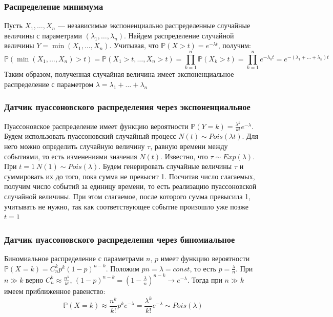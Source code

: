 \documentclass{article}
\theoremstyle{definition}
\begin{document}
\subsubsection{Распределение минимума}

Пусть $X_1, \dots, X_n$ --- независимые экспоненциально распределенные случайные величины с параметрами $(\lambda_1, \dots, \lambda_n)$. Найдем распределение случайной величины $Y = \min(X_1, \dots, X_n)$. Учитывая, что $\mathbb{P}(X > t) = e^{-\lambda t}$, получим:
$$\mathbb{P}(\min(X_1, \dots, X_n) > t) = \mathbb{P}(X_1 > t, \dots, X_n > t) = \prod_{k = 1}^n\mathbb{P}(X_k > t) = \prod_{k = 1}^n e^{-\lambda_k t} = e^{-(\lambda_1 + \ldots + \lambda_n) t}$$
Таким образом, полученная случайная величина имеет экспоненциальное распределение с параметром $\lambda = \lambda_1 + \ldots + \lambda_n$

\subsubsection{Датчик пуассоновского распределения через экспоненциальное}

Пуассоновское распределение имеет функцию вероятности $\mathbb{P}(Y = k) = \frac{\lambda^k}{k!}e^{-\lambda}$. Будем использовать пуассоновский случайный процесс $N(t) \sim Pois(\lambda t)$. Для него можно определить случайную величину $\tau$, равную времени между событиями, то есть изменениями значения $N(t)$. Известно, что $\tau \sim Exp(\lambda)$. При $t = 1\ N(1) \sim Pois(\lambda)$. Будем генерировать случайные величины $\tau$ и суммировать их до того, пока сумма не превысит 1. Посчитав число слагаемых, получим число событий за единицу времени, то есть реализацию пуассоновской случайной величины. При этом слагаемое, после которого сумма превысила 1, учитывать не нужно, так как соответствующее событие произошло уже позже $t = 1$

\subsubsection{Датчик пуассоновского распределения через биномиальное}

Биномиальное распределение с параметрами $n,\, p$ имеет функцию вероятности $\mathbb{P}(X = k) = C_n^kp^k(1-p)^{n - k}$. Положим $pn = \lambda = const$, то есть $p = \frac{\lambda}{n}$. При $n \gg k$ верно $C_n^k \approx \frac{n^k}{k!}$, $(1 - p)^{n - k} = \left(1 - \frac{\lambda}{n}\right)^{n - k} \rightarrow e^{-\lambda}$. Тогда при $n \gg k$ имеем приближенное равенство:
$$\mathbb{P}(X = k) \approx \frac{n^k}{k!}p^ke^{-\lambda} = \frac{\lambda^k}{k!}e^{-\lambda} \sim Pois(\lambda)$$
\end{document}
